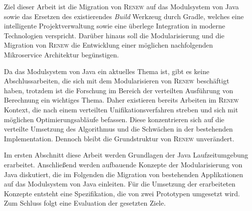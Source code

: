 Ziel dieser Arbeit ist die Migration von \textsc{Renew} auf das Modulsystem von Java sowie das Ersetzen des existierendes \textit{Build} Werkzeug durch Gradle, welches eine intelligente Projektverwaltung sowie eine überlege Integration in moderne Technologien verspricht. \newline
Darüber hinaus soll die Modularisierung und die Migration von \textsc{Renew} die Entwicklung einer möglichen nachfolgenden Mikroservice Architektur begünstigen.\bigbreak

Da das Modulsystem von Java ein aktuelles Thema ist, gibt es keine Abschlussarbeiten, die sich mit dem Modularisieren von \textsc{Renew} beschäftigt haben, trotzdem ist die Forschung im Bereich der verteilten Ausführung von Berechnung ein wichtiges Thema. Daher existieren bereits Arbeiten im \textsc{Renew} Kontext, die nach einem verteilten Unifikationsverfahren streben und sich mit möglichen Optimierungsabläufe befassen.
Diese konzentrieren sich auf die verteilte Umsetzung des Algorithmus und die Schwächen in der bestehenden Implementation. Dennoch bleibt die Grundstruktur von \textsc{Renew} unverändert. \bigbreak

Im ersten Abschnitt diese Arbeit werden Grundlagen der Java Laufzeitumgebung erarbeitet. Anschließend werden aufbauende Konzepte der Modularisierung von Java diskutiert, die im Folgenden die Migration von bestehenden Applikationen auf das Modulsystem von Java einleiten. Für die Umsetzung der erarbeiteten Konzepte entsteht eine Spezifikation, die von zwei Prototypen umgesetzt wird. Zum Schluss folgt eine Evaluation der gesetzten Ziele.
\linespread{1.0}\selectfont

\tableofcontents %
\setcounter{lofdepth}{5}
\listoffigures
\blankpage





 
 

\blankpage
      
\begin{appendices}
\end{appendices}

\blankpage

